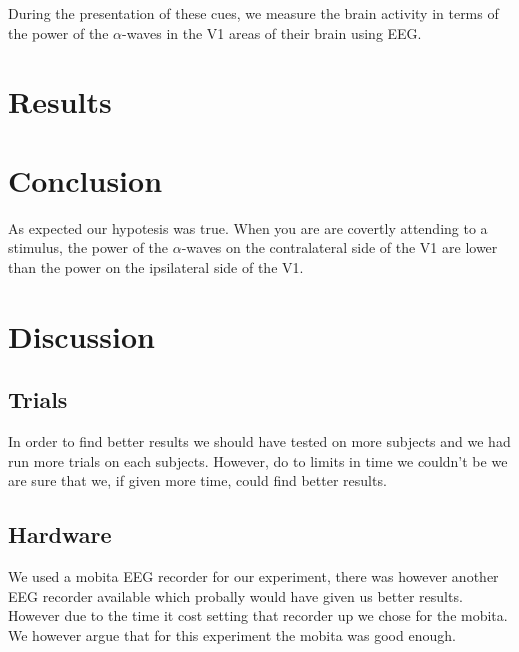 \documentclass{article}
\begin{document}
During the presentation of these cues, we measure the brain activity in terms
of the power of the $\alpha$-waves in the V1 areas of their brain using EEG.

\section{Results}

\section{Conclusion}
As expected our hypotesis was true. When you are are covertly attending to a
stimulus, the power of the $\alpha$-waves on the contralateral side of the V1
are lower than the power on the ipsilateral side of the V1.

\section{Discussion}
\subsection{Trials}
In order to find better results we should have tested on more subjects and we
had run more trials on each subjects. However, do to limits in time we couldn't
be we are sure that we, if given more time, could find better results.
\subsection{Hardware}
We used a mobita EEG recorder for our experiment, there was however another EEG
recorder available which probally would have given us better results. However
due to the time it cost setting that recorder up we chose for the mobita. We
however argue that for this experiment the mobita was good enough.

 
\end{document}
